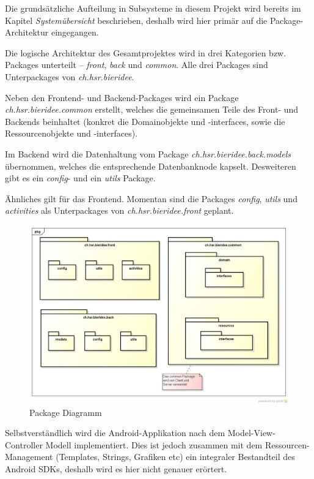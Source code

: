 \documentclass[10pt,a4paper]{scrartcl}
\begin{document}
Die grundsätzliche Aufteilung in Subsysteme in diesem Projekt wird bereits im Kapitel
\textit{Systemübersicht} beschrieben, deshalb wird hier primär auf die Package-Architektur
eingegangen.

Die logische Architektur des Gesamtprojektes wird in drei Kategorien bzw. Packages unterteilt --
\textit{front}, \textit{back} und \textit{common}. Alle drei Packages sind Unterpackages von
\textit{ch.hsr.bieridee}.

Neben den Frontend- und Backend-Packages wird ein Package \textit{ch.hsr.bieridee.common} erstellt,
welches die gemeinsamen Teile des Front- und Backends beinhaltet (konkret die Domainobjekte und
-interfaces, sowie die Ressourcenobjekte und -interfaces).

Im Backend wird die Datenhaltung vom Package \textit{ch.hsr.bieridee.back.models} übernommen,
welches die entsprechende Datenbanknode kapselt. Desweiteren gibt es ein \textit{config}- und ein
\textit{utils} Package.

Ähnliches gilt für das Frontend. Momentan sind die Packages \textit{config}, \textit{utils} und
\textit{activities} als Unterpackages von \textit{ch.hsr.bieridee.front} geplant.

\begin{figure}[H]
	\includegraphics[width=\textwidth]{PackageDiagramm.png}
	\caption{Package Diagramm}
	\label{fig:package_diagram}
\end{figure}

Selbstverständlich wird die Android-Applikation nach dem Model-View-Controller Modell implementiert.
Dies ist jedoch zusammen mit dem Ressourcen-Management (Templates, Strings, Grafiken etc) ein integraler Bestandteil des Android SDKs, deshalb wird es hier nicht genauer erörtert.
\end{document}
